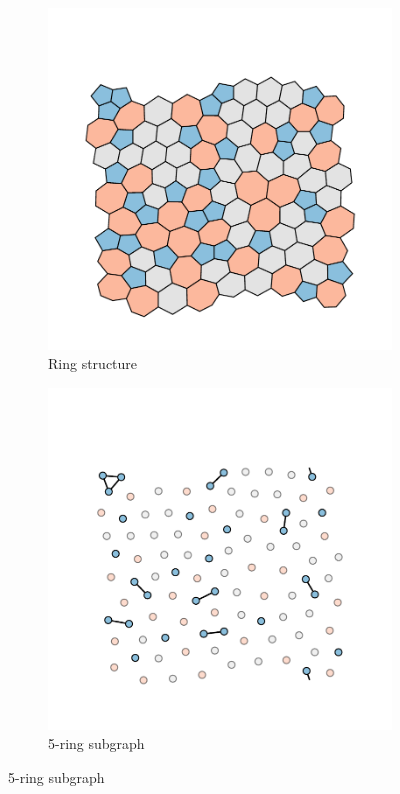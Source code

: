 \begin{figure}[bt]
     \centering
     
     \begin{subfigure}[b]{0.3\textwidth}
         \centering
         \includegraphics[width=\textwidth]{./figures/targeted_opt/subgraph_rings.pdf}
         \caption{Ring structure}
         \label{fig:percsub1}
     \end{subfigure}
     \hspace{1cm}
      \begin{subfigure}[b]{0.3\textwidth}
         \centering
         \includegraphics[width=\textwidth]{./figures/targeted_opt/subgraph_5.pdf}
         \caption{5\--ring subgraph}
         \label{fig:percsub2}
     \end{subfigure}
     

\end{figure}
